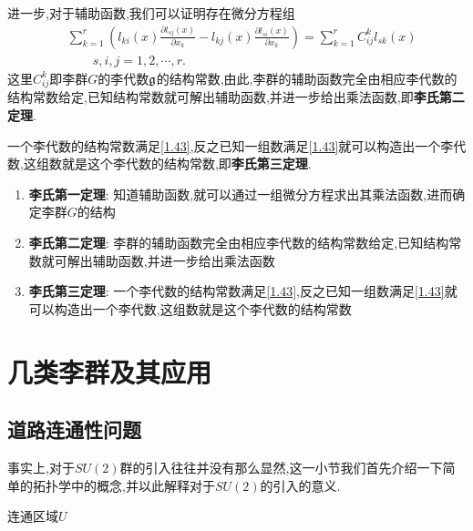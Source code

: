 进一步,对于辅助函数,我们可以证明存在微分方程组
\begin{equation}
    \begin{aligned}&\sum_{k=1}^r(l_{ki}(x)\frac{\partial l_{sj}(x)}{\partial x_k}-l_{kj}(x)\frac{\partial l_{si}(x)}{\partial x_k})=\sum_{k=1}^rC_{ij}^kl_{sk}(x)\\&\qquad s,i,j=1,2,\cdots,r.\end{aligned}
\end{equation}
这里$C_{ij}^k$即李群$ G $的李代数$\mathfrak{g}$的结构常数,由此,李群的辅助函数完全由相应李代数的结构常数给定,已知结构常数就可解出辅助函数,并进一步给出乘法函数,即\textbf{李氏第二定理}.

一个李代数的结构常数满足\ref{1.43},反之已知一组数满足\ref{1.43}就可以构造出一个李代数,这组数就是这个李代数的结构常数,即\textbf{李氏第三定理}.

\begin{kaobox}[frametitle=李氏三定理]
    \begin{enumerate}
        \item \textbf{李氏第一定理}: 知道辅助函数,就可以通过一组微分方程求出其乘法函数,进而确定李群$ G $的结构
        \item \textbf{李氏第二定理}: 李群的辅助函数完全由相应李代数的结构常数给定,已知结构常数就可解出辅助函数,并进一步给出乘法函数
        \item \textbf{李氏第三定理}: 一个李代数的结构常数满足\ref{1.43},反之已知一组数满足\ref{1.43}就可以构造出一个李代数,这组数就是这个李代数的结构常数
    \end{enumerate}
\end{kaobox}


\section{几类李群及其应用}
\subsection{道路连通性问题}
事实上,对于$SU(2)$群的引入往往并没有那么显然,这一小节我们首先介绍一下简单的拓扑学中的概念,并以此解释对于$SU(2)$的引入的意义.
\begin{marginfigure}
    \centering
    \caption{连通区域$U$}
\end{marginfigure}

